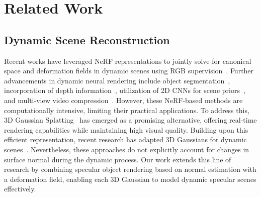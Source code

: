 \section{Related Work}
\label{sec:related}
\subsection{Dynamic Scene Reconstruction}
Recent works have leveraged NeRF representations to jointly solve for canonical space and deformation fields in dynamic scenes using RGB supervision~\citep{guo2023forward, li2021neural, park2021nerfies, park2021hypernerf, pumarola2020dnerf, tretschk2021nonrigid, xian2021spacetime,liu2023robust,wu2024denver,chen2024narcan,ma2024humannerf}. Further advancements in dynamic neural rendering include object segmentation~\citep{song2023nerfplayer}, incorporation of depth information~\citep{attal2021torf}, utilization of 2D CNNs for scene priors~\citep{lin2022efficient, peng2023representing}, and multi-view video compression~\citep{li2022neural3D}. However, these NeRF-based methods are computationally intensive, limiting their practical applications. To address this, 3D Gaussian Splatting~\citep{kerbl20233d} has emerged as a promising alternative, offering real-time rendering capabilities while maintaining high visual quality. Building upon this efficient representation, recent research has adapted 3D Gaussians for dynamic scenes~\citep{yang2023deformable, wu20234d, huang2024scgs, liang2023gaufre,wang2024shape,mihajlovic2024splatfields,stearns2024dynamic}. Nevertheless, these approaches do not explicitly account for changes in surface normal during the dynamic process. Our work extends this line of research by combining specular object rendering based on normal estimation with a deformation field, enabling each 3D Gaussian to model dynamic specular scenes effectively.

